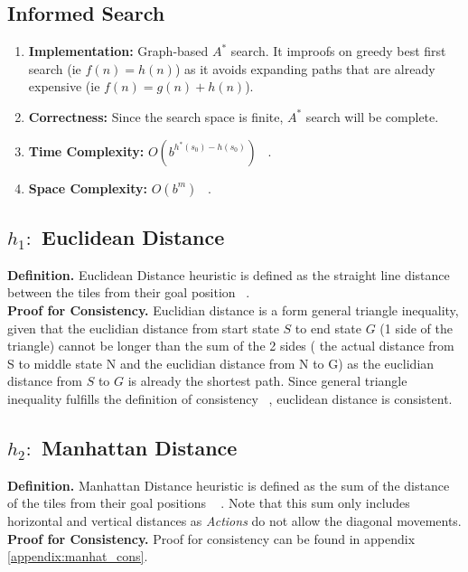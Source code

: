 \documentclass[runningheads]{llncs}
\begin{document}
\subsection{Informed Search}
\begin{enumerate}
    \item \textbf{Implementation:} Graph-based \( A^* \) search. It improofs on greedy best first search (ie \( f(n) = h(n) \)) as it avoids expanding paths that are already expensive (ie \( f(n) = g(n) + h(n) \)).
    \item \textbf{Correctness:} Since the search space is finite, \( A^* \) search will be complete.
    \item \textbf{Time Complexity:} \( O(b^{h^*(s_0) - h(s_0)}) \) ~\cite[p93-99]{stuart_russell_artifical_2010}.
    \item \textbf{Space Complexity:} \( O(b^m) \) ~\cite[p93-99]{stuart_russell_artifical_2010}.
\end{enumerate}

\subsection{\(h_1:\) Euclidean Distance}
\textbf{Definition.} Euclidean Distance heuristic is defined as the straight line distance between the tiles from their goal position ~\cite{rosalind_euclidean_nodate}. \\
\textbf{Proof for Consistency.} Euclidian distance is a form general triangle inequality, given that the euclidian distance from start state \( S \) to end state \( G \) (1 side of the triangle) cannot be longer than the sum of the 2 sides ( the actual distance from S to middle state N and the euclidian distance from N to G) as the euclidian distance from \( S \) to \( G \) is already the shortest path. 
Since general triangle inequality fulfills the definition of consistency ~\cite[p95]{stuart_russell_artifical_2010}, euclidean distance is consistent.

\subsection{\(h_2:\) Manhattan Distance} 
\textbf{Definition.} Manhattan Distance heuristic is defined as the sum of the distance of the tiles from their goal positions ~\cite[p103]{stuart_russell_artifical_2010} . Note that this sum only includes horizontal and vertical distances as \textit{Actions} do not allow the diagonal movements. \\
\textbf{Proof for Consistency.} Proof for consistency can be found in appendix \ref{appendix:manhat_cons}.
\end{document}
